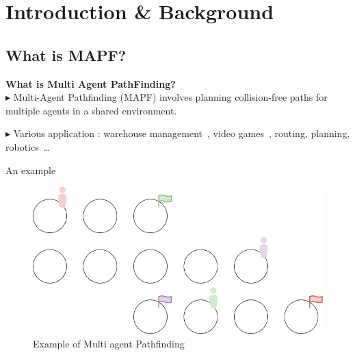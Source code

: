 \section{Introduction \& Background}
\subsection{What is MAPF?}
\begin{frame}
    \textbf{What is Multi Agent PathFinding?} \\[1cm]

    \(\blacktriangleright \) Multi-Agent Pathfinding (MAPF) involves planning collision-free paths for multiple agents in a shared environment.

    \(\blacktriangleright \) Various application : warehouse management~\cite{wurman2008coordinating}, video games~\cite{ma2017feasibility}, routing, planning, robotics~\cite{veloso2015cobots}\dots


\end{frame}

\begin{frame}{An example}
    
    \begin{figure}[H]
        \centering
        \caption{Example of Multi agent Pathfinding}
        \includegraphics[width=\widthimg]{img/MAPF_example_1.drawio.png}
    \end{figure}

\end{frame}


